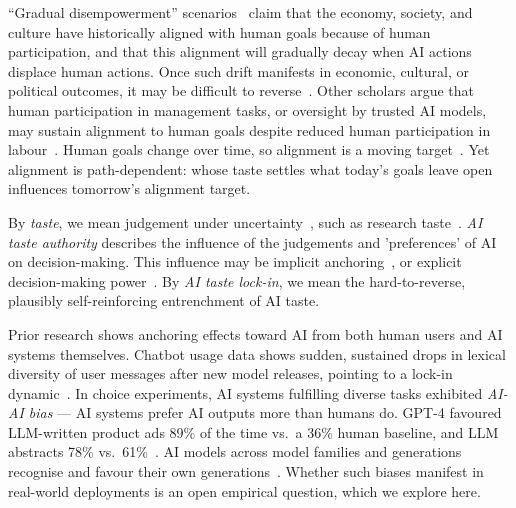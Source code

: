 \documentclass{article}
\begin{document}
``Gradual disempowerment'' scenarios~\citep{kulveit2025gradual} claim that the economy, society, and culture have historically aligned with human goals because of human participation, and that this alignment will gradually decay when AI actions displace human actions. Once such drift manifests in economic, cultural, or political outcomes, it may be difficult to reverse~\citep{collingridge1980social}. Other scholars argue that human participation in management tasks, or oversight by trusted AI models, may sustain alignment to human goals despite reduced human participation in labour~\citep{bowman2022oversight,tomasev2026delegation}. Human goals change over time, so alignment is a moving target~\citep{qiu2024progressgym}. Yet alignment is path-dependent: whose taste settles what today's goals leave open influences tomorrow's alignment target.

By \emph{taste}, we mean judgement under uncertainty~\citep{hume1757taste,tversky1974judgment}, such as research taste~\citep{nanda2025researchtaste}. \emph{AI taste authority} describes the influence of the judgements and 'preferences' of AI on decision-making. This influence may be implicit anchoring~\citep{tversky1974judgment,jakesch2023cowriting,rastogi2022deciding}, or explicit decision-making power~\citep{tomasev2026delegation}. By \emph{AI taste lock-in}, we mean the hard-to-reverse, plausibly self-reinforcing entrenchment of AI taste.

Prior research shows anchoring effects toward AI from both human users and AI systems themselves. Chatbot usage data shows sudden, sustained drops in lexical diversity of user messages after new model releases, pointing to a lock-in dynamic~\citep{qiu2025lockin}. In choice experiments, AI systems fulfilling diverse tasks exhibited \emph{AI-AI bias} --- AI systems prefer AI outputs more than humans do. GPT-4 favoured LLM-written product ads 89\% of the time vs.\ a 36\% human baseline, and LLM abstracts 78\% vs.\ 61\%~\citep{laurito2025aibias}. AI models across model families and generations recognise and favour their own generations~\citep{panickssery2024evaluators,chen2025selfprefer,pombal2026rubric}. Whether such biases manifest in real-world deployments is an open empirical question, which we explore here.
\end{document}
